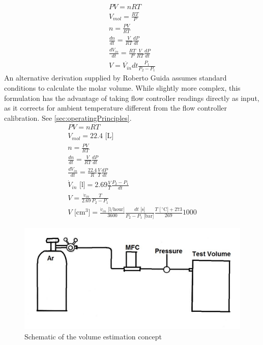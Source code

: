 \documentclass{report}
\begin{document}
\begin{eqnarray}
PV = nRT \label{ideal}\\
V_{mol} = \frac{RT}{P} \label{molarVolume}\\
n = \frac{PV}{RT} \nonumber \\
\frac{dn}{dt} =  \frac {V}{RT} \frac {dP}{dt} \nonumber \\
\frac{dV_{in}}{dt} =  \frac{RT}{P} \frac {V}{RT} \frac {dP}{dt} \nonumber \\
V = \dot{V_{in}} dt \frac{P_1}{P_2 - P_1}
\end{eqnarray}
An alternative derivation supplied by Roberto Guida assumes standard conditions to calculate the molar volume. While slightly more complex, this formulation has the advantage of taking flow controller readings directly as input, as it corrects for ambient temperature different from the flow controller calibration. See \ref{sec:operatingPrinciples}.
\begin{eqnarray}
PV = nRT \nonumber\\
V_{mol} = 22.4 \text{ [L]}\\
n = \frac{PV}{RT} \nonumber \\
\frac{dn}{dt} =  \frac {V}{RT} \frac {dP}{dt} \nonumber \\
\frac{dV_{in}}{dt} =  \frac{22.4}{R} \frac {V}{T} \frac {dP}{dt} \nonumber \\
\dot{V}_{in}\text{ [l]} = 2.69\frac{V}{T} \frac{P_2 - P_1}{dt} \nonumber \\
V = \frac{\dot{v}_{in}}{2.69} \frac{T}{P_2 - P_1}\nonumber \\
V\text{ [cm$^3$]} = \frac{\dot{v}_{in}\text{ [l/hour]}}{3600}\frac{dt\text{ [s]}}{P_2-P_1 \text{ [bar]}}\frac{T\text{ [$\,^{\circ}\mathrm{C}$]}+273}{269}1000 \label{roberto}
\end{eqnarray}
\begin{figure}[h]\label{schematic}
\includegraphics[width=\textwidth]{schematic}
\caption{Schematic of the volume estimation concept}
\end{figure}
\\
\end{document}

